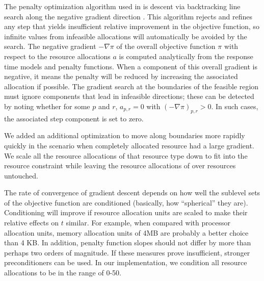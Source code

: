 The penalty optimization algorithm used in \pacora is descent via backtracking line search along the negative gradient direction \cite{BoVa}.
This algorithm rejects and refines any step that yields insufficient relative improvement in the objective function,
so infinite values from infeasible allocations will automatically be avoided by the search.
The negative gradient $-\nabla\pi$ of the overall objective function $\pi$
with respect to the resource allocations $a$
is computed analytically from the response time models and penalty functions.
When a component of this overall gradient is negative,
it means the penalty will be reduced by increasing the associated allocation if possible.
The gradient search at the boundaries of the feasible region
must ignore components that lead in infeasible directions;
these can be detected by noting whether for some $p$ and $r$, $a_{p,r} = 0$ with $(-\nabla\pi)_{p,r} > 0$.
In such cases, the associated step component is set to zero.

We added an additional optimization to move along boundaries more rapidly quickly in the scenario when completely allocated resource had a large gradient.  We scale all the resource allocations of that resource type down to fit into the resource constraint while leaving the resource allocations of over resources untouched.

The rate of convergence of gradient descent depends on how well the sublevel sets of the objective function
are conditioned (basically, how ``spherical'' they are).
Conditioning will improve if resource allocation units are scaled to make their relative effects on $t$ similar.
For example, when compared with processor allocation units,
memory allocation units of 4MB are probably a better choice than 4 KB.
In addition, penalty function slopes should not differ by more than perhaps two orders of magnitude. If these measures prove insufficient, stronger preconditioners can be used. In our implementation, we condition all resource allocations to be in the range of 0-50.
